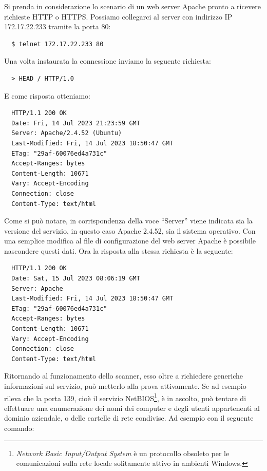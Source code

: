 \documentclass[target=bach,aauheader=]{thud}
\begin{document}
Si prenda in considerazione lo scenario di un web server Apache pronto a ricevere richieste HTTP o HTTPS. Possiamo collegarci al server con indirizzo IP 172.17.22.233 tramite la porta 80:

\begin{verbatim}
  $ telnet 172.17.22.233 80
\end{verbatim}

Una volta instaurata la connessione inviamo la seguente richiesta:

\begin{verbatim}
  > HEAD / HTTP/1.0
\end{verbatim}

E come risposta otteniamo:

\begin{verbatim}
  HTTP/1.1 200 OK
  Date: Fri, 14 Jul 2023 21:23:59 GMT
  Server: Apache/2.4.52 (Ubuntu)
  Last-Modified: Fri, 14 Jul 2023 18:50:47 GMT
  ETag: "29af-60076ed4a731c"
  Accept-Ranges: bytes
  Content-Length: 10671
  Vary: Accept-Encoding
  Connection: close
  Content-Type: text/html
\end{verbatim}

Come si può notare, in corrispondenza della voce “Server” viene indicata sia la versione del servizio, in questo caso Apache 2.4.52, sia il sistema operativo. Con una semplice modifica al file di configurazione del web server Apache è possibile nascondere questi dati. Ora la risposta alla stessa richiesta è la seguente:

\begin{verbatim}
  HTTP/1.1 200 OK
  Date: Sat, 15 Jul 2023 08:06:19 GMT
  Server: Apache
  Last-Modified: Fri, 14 Jul 2023 18:50:47 GMT
  ETag: "29af-60076ed4a731c"
  Accept-Ranges: bytes
  Content-Length: 10671
  Vary: Accept-Encoding
  Connection: close
  Content-Type: text/html
\end{verbatim}

Ritornando al funzionamento dello scanner, esso oltre a richiedere generiche informazioni sul servizio, può metterlo alla prova attivamente. Se ad esempio rileva che la porta 139, cioè il servizio NetBIOS\footnote{\textit{Network Basic Input/Output System} è un protocollo obsoleto per le comunicazioni sulla rete locale solitamente attivo in ambienti Windows.}, è in ascolto, può tentare di effettuare una enumerazione dei nomi dei computer e degli utenti appartenenti al dominio aziendale, o delle cartelle di rete condivise. Ad esempio con il seguente comando:
\end{document}
